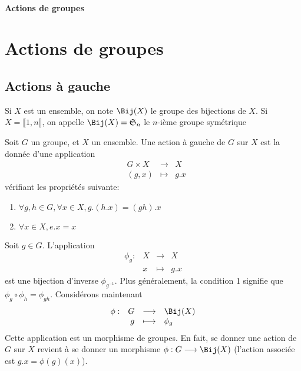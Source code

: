 \ifsolo
    ~

    \vspace{1cm}

    \begin{center}
        \textbf{\LARGE Actions de groupes} \\[1em]
    \end{center}
    \tableofcontents
\else
    \chapter{Actions de groupes}

    \minitoc
\fi
\thispagestyle{empty}

\section{Actions à gauche}

\begin{dfn}
    Si $X$ est un ensemble, on note  $\Bij(X)$ le groupe des bijections de  $X$. Si $X = \llbracket 1, n \rrbracket $, on appelle $\Bij(X)=\gS_n$ le $n$-ième groupe symétrique
\end{dfn}

\begin{dfn}
    Soit $G$ un groupe, et  $X$ un ensemble. Une action à gauche de  $G$ sur  $X$ est la donnée d'une application  \[
    \begin{array}{rrcl}
        & G\times X & \longrightarrow & X \\
        & (g, x) & \longmapsto & \displaystyle g.x
    \end{array}
    \] 
    vérifiant les propriétés suivante: \begin{enumerate}
        \item $\forall  g, h \in  G, \forall  x \in  X, g.(h.x)=(gh).x$
        \item $\forall  x \in  X, e.x=x$
    \end{enumerate}
\end{dfn}

\begin{rem}
Soit $g \in  G$. L'application \[
\begin{array}{rrcl}
    \phi_g:& X & \longrightarrow & X \\
    & x & \longmapsto & \displaystyle g.x
\end{array}
\] 
est une bijection d'inverse $\phi_{g^{-1}}$. Plus généralement, la condition 1 signifie que $\phi_g\circ \phi_h=\phi_{gh}$. Considérons maintenant  \[
\begin{array}{rrcl}
    \phi:& G & \longrightarrow & \Bij(X) \\
    & g & \longmapsto & \displaystyle \phi_g
\end{array}
\] 
Cette application est un morphisme de groupes. En fait, se donner une action de $G$ sur  $X$ revient à se donner un morphisme  $\phi:G \longrightarrow \Bij(X)$ (l'action associée est $g.x=\phi(g)(x)$).
\end{rem}


